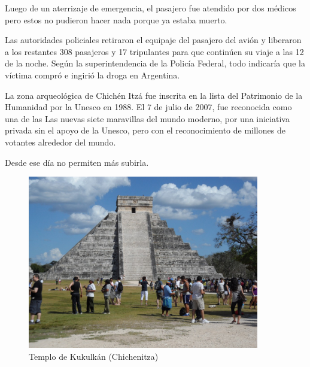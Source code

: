 \documentclass[11pt,twoside,openright,a6paper]{book}
\begin{document}
Luego de un aterrizaje de emergencia, el pasajero fue atendido por dos
médicos pero estos no pudieron hacer nada porque ya estaba muerto.

Las autoridades policiales retiraron el equipaje del pasajero del avión y
liberaron a los restantes 308 pasajeros y 17 tripulantes para que continúen
su viaje a las 12 de la noche.  Según la superintendencia de la Policía
Federal, todo indicaría que la víctima compró e ingirió la droga en
Argentina.


\vspace{0.5cm}
\hrulefill\hspace{0.2cm} \decofourleft\decofourright \hspace{0.2cm} \hrulefill
\vspace{0.5cm}

La zona arqueológica de Chichén Itzá fue inscrita en la lista del
Patrimonio de la Humanidad por la Unesco en 1988. El 7 de julio de 2007, fue
reconocida como una de las Las nuevas siete maravillas del mundo moderno, por
una iniciativa privada sin el apoyo de la Unesco, pero con el reconocimiento
de millones de votantes alrededor del mundo.

Desde ese día no permiten más subirla.

\begin{figure}[H]
  \centering
    \includegraphics[width=0.9\textwidth]{fotos/2012/chichen}
  \caption{Templo de Kukulkán (Chichenitza)}
  \label{Templo de Kukulkán (Chichenitza)}
\end{figure}


\vspace{0.5cm}
\hrulefill\hspace{0.2cm} \decofourleft\decofourright \hspace{0.2cm} \hrulefill
\vspace{0.5cm}
\end{document}
